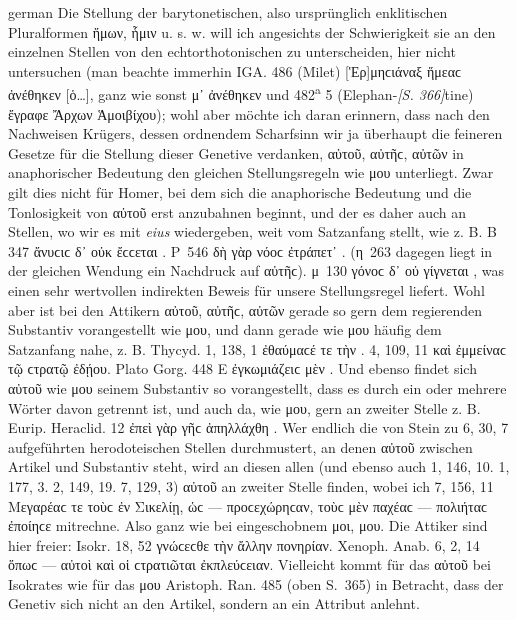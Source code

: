 \begin{otherlanguage*}{german}
Die Stellung der barytonetischen, also ursprünglich enklitischen Pluralformen ἥμων, ἧμιν u. s. w. will ich angesichts der Schwierigkeit sie an den einzelnen Stellen von den echtorthotonischen zu unterscheiden, hier nicht untersuchen (man beachte immerhin IGA. 486 (Milet) [Ἑρ]μηϲιάναξ ἥμεαϲ ἀνέθηκεν [ὁ…], ganz wie sonst μ᾽ ἀνέθηκεν und 482\textsuperscript{a} 5 (Elephan-\hypertarget{p366}{\emph{[S. 366]}}\label{p366}tine) ἔγραφε  Ἄρχων Ἁμοιβίχου); wohl aber möchte ich daran erinnern, dass nach den Nachweisen Krügers, dessen ordnendem Scharfsinn wir ja überhaupt die feineren Gesetze für die Stellung dieser Genetive verdanken, αὐτοῦ, αὐτῆϲ, αὐτῶν in anaphorischer Bedeutung den gleichen Stellungsregeln wie μου unterliegt. Zwar gilt dies nicht für Homer, bei dem sich die anaphorische Bedeutung und die Tonlosigkeit von αὐτοῦ erst anzubahnen beginnt, und der es daher auch an Stellen, wo wir es mit \emph{eius} wiedergeben, weit vom Satzanfang stellt, wie z. B. B 347 ἄνυϲιϲ δ᾽ οὐκ ἔϲϲεται . Ρ~546 δὴ γὰρ νόοϲ ἐτράπετ᾽ . (η~263 dagegen liegt in der gleichen Wendung ein Nachdruck auf αὐτῆϲ). μ~130 γόνοϲ δ᾽ οὐ γίγνεται , was einen sehr wertvollen indirekten Beweis für unsere Stellungsregel liefert. Wohl aber ist bei den Attikern αὐτοῦ, αὐτῆϲ, αὐτῶν gerade so gern dem regierenden Substantiv vorangestellt wie μου, und dann gerade wie μου häufig dem Satzanfang nahe, z. B. Thycyd. 1, 138, 1 ἐθαύμαϲέ τε  τὴν . 4, 109, 11 καὶ  ἐμμείναϲ τῷ ϲτρατῷ ἐδῄου. Plato Gorg. 448 Ε ἐγκωμιάζειϲ μὲν . Und ebenso findet sich αὐτοῦ wie μου seinem Substantiv so vorangestellt, dass es durch ein oder mehrere Wörter davon getrennt ist, und auch da, wie μου, gern an zweiter Stelle z. B. Eurip. Heraclid. 12 ἐπεὶ γὰρ  γῆϲ ἀπηλλάχθη . Wer endlich die von Stein zu 6, 30, 7 aufgeführten herodoteischen Stellen durchmustert, an denen αὐτοῦ zwischen Artikel und Substantiv steht, wird an diesen allen (und ebenso auch 1, 146, 10. 1, 177, 3. 2, 149, 19. 7, 129, 3) αὐτοῦ an zweiter Stelle finden, wobei ich 7, 156, 11 Μεγαρέαϲ τε τοὺϲ ἐν Σικελίῃ, ὡϲ — προϲεχώρηϲαν, τοὺϲ μὲν  παχέαϲ — πολιήταϲ ἐποίηϲε mitrechne. Also ganz wie bei eingeschobnem μοι, μου. Die Attiker sind hier freier: Isokr. 18, 52 γνώϲεϲθε τὴν ἄλλην  πονηρίαν. Xenoph. Anab. 6, 2, 14 ὅπωϲ — αὐτοὶ καὶ οἱ  ϲτρατιῶται ἐκπλεύϲειαν. Vielleicht kommt für das αὐτοῦ bei Isokrates wie für das μου Aristoph. Ran. 485 (oben S.~365) in Betracht, dass der Genetiv sich nicht an den Artikel, sondern an ein Attribut anlehnt.


\end{otherlanguage*}
